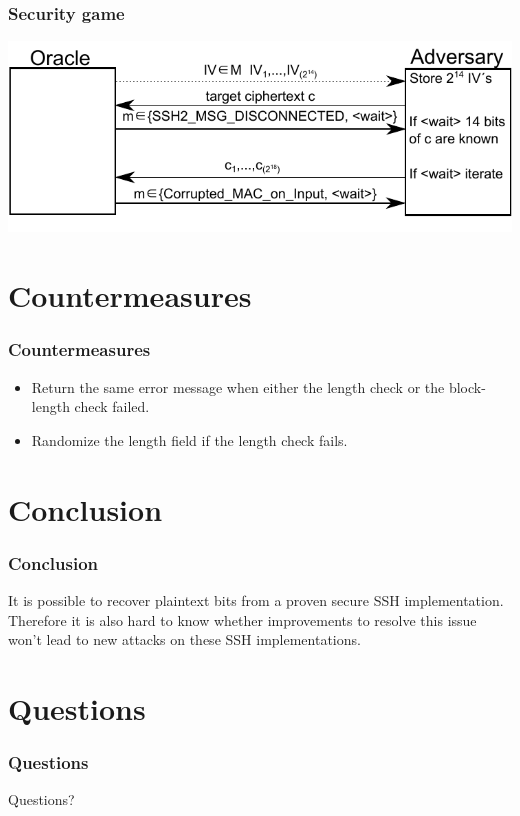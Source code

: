 \documentclass[fleqn]{beamer}
\begin{document}
  \begin{frame}
    \frametitle{Security game}
    \begin{center}
    \includegraphics[scale=.8]{drawing.pdf}
    \end{center}
  \end{frame}

\section{Countermeasures}

   \begin{frame}
    \frametitle{Countermeasures}
        \begin{itemize}
      \item Return the same error message when either the length check or the block-length check failed.
      \item Randomize the length field if the length check fails.
    \end{itemize}   
  \end{frame}	

\section{Conclusion}

   \begin{frame}
    \frametitle{Conclusion}
     It is possible to recover plaintext bits from a proven secure SSH implementation. Therefore it is also hard to know whether improvements to resolve this issue won't lead to new attacks on these SSH implementations.
  \end{frame}	

\section{Questions}

  \begin{frame}
    \frametitle{Questions}
    \begin{center}
    Questions?
    \end{center}
  \end{frame}
\end{document}
